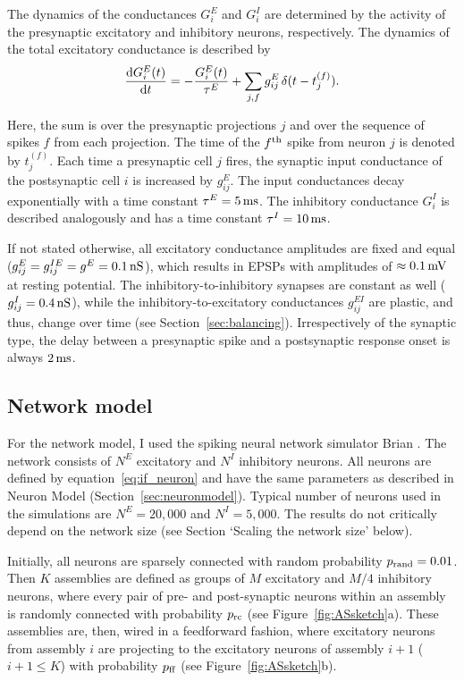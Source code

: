     The dynamics of the conductances $G_i^E$ and $G_i^I$ are determined by the activity of the presynaptic excitatory and inhibitory neurons, respectively. The dynamics of the total excitatory conductance is described by
    \begin{equation}
      \frac{{\rm d} G_i^E(t)}{{\rm d} t} = -\frac{G_i^E(t)}{\tau^E} + \sum_{j,f} g_{ij}^{E} \, \delta(t-t_{j}^{(f)}) .
      \label{eq:conductance}
    \end{equation}

    Here, the sum is over the presynaptic projections $j$ and over the sequence of spikes $f$ from each projection. The time of the $f^{\rm th}$ spike from neuron $j$ is denoted by $t_{j}^{(f)}$. Each time a presynaptic cell $j$ fires, the synaptic input conductance of the postsynaptic cell $i$ is increased by $g_{ij}^E$. The input conductances decay exponentially with a time constant $\tau^E = 5\, {\rm ms}$. The inhibitory conductance $G^I_i$ is described analogously and has a time constant $\tau^I = 10\, {\rm ms}$.
  
    If not stated otherwise, all excitatory conductance amplitudes are fixed and equal ($g_{ij}^E = g_{ij}^{IE} = g^E = 0.1\, {\rm nS}$), which results in EPSPs with amplitudes of $\approx 0.1\, {\rm mV}$ at resting potential. The inhibitory-to-inhibitory synapses are constant as well ($g_{ij}^I =0.4\, {\rm nS}$), while the inhibitory-to-excitatory conductances $g_{ij}^{EI}$ are plastic, and thus, change over time (see Section~\ref{sec:balancing}). Irrespectively of the synaptic type, the delay between a presynaptic spike and a postsynaptic response onset is always $2\, {\rm ms}$.

  \subsection{Network model}
    For the network model, I used the spiking neural network simulator Brian \citep{Goodman2009}. The network consists of $N^E$ excitatory and $N^I$ inhibitory neurons. All neurons are defined by equation~\ref{eq:if_neuron} and have the same parameters as described in Neuron Model (Section~\ref{sec:neuronmodel}). Typical number of neurons used in the simulations are $N^E=20,000$ and $N^I=5,000$. The results do not critically depend on the network size (see Section `Scaling the network size' below).

    Initially, all neurons are sparsely connected with random probability $p_{\rm rand}=0.01$. Then $K$ assemblies are defined as groups of $M$ excitatory and $M/4$ inhibitory neurons, where every pair of pre- and post-synaptic neurons within an assembly is randomly connected with probability $p_{\rm rc}$ (see Figure~\ref{fig:ASsketch}a). These assemblies are, then, wired in a feedforward fashion, where excitatory neurons from assembly $i$ are projecting to the excitatory neurons of assembly $i+1$ ($i+1 \le K$) with probability $p_{\rm ff}$ (see Figure~\ref{fig:ASsketch}b).

